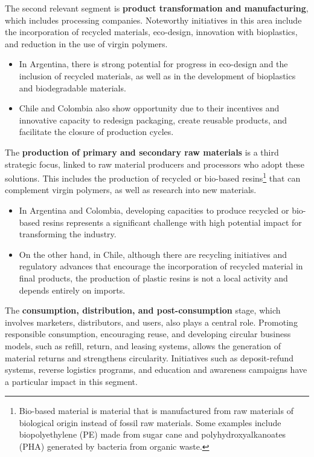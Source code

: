 \documentclass[
  12pt,
  oneside]{book}
\providecommand{\tightlist}{%
  \setlength{\itemsep}{0pt}\setlength{\parskip}{0pt}}
\begin{document}
The second relevant segment is \textbf{product transformation and
manufacturing}, which includes processing companies. Noteworthy
initiatives in this area include the incorporation of recycled
materials, eco-design, innovation with bioplastics, and reduction in the
use of virgin polymers.

\begin{itemize}
\tightlist
\item
  In Argentina, there is strong potential for progress in eco-design and
  the inclusion of recycled materials, as well as in the development of
  bioplastics and biodegradable materials.
\item
  Chile and Colombia also show opportunity due to their incentives and
  innovative capacity to redesign packaging, create reusable products,
  and facilitate the closure of production cycles.
\end{itemize}

The \textbf{production of primary and secondary raw materials} is a
third strategic focus, linked to raw material producers and processors
who adopt these solutions. This includes the production of recycled or
bio-based resins\footnote{Bio-based material is material that is
  manufactured from raw materials of biological origin instead of fossil
  raw materials. Some examples include biopolyethylene (PE) made from
  sugar cane and polyhydroxyalkanoates (PHA) generated by bacteria from
  organic waste.} that can complement virgin polymers, as well as
research into new materials.

\begin{itemize}
\tightlist
\item
  In Argentina and Colombia, developing capacities to produce recycled
  or bio-based resins represents a significant challenge with high
  potential impact for transforming the industry.
\item
  On the other hand, in Chile, although there are recycling initiatives
  and regulatory advances that encourage the incorporation of recycled
  material in final products, the production of plastic resins is not a
  local activity and depends entirely on imports.
\end{itemize}

The \textbf{consumption, distribution, and post-consumption} stage,
which involves marketers, distributors, and users, also plays a central
role. Promoting responsible consumption, encouraging reuse, and
developing circular business models, such as refill, return, and leasing
systems, allows the generation of material returns and strengthens
circularity. Initiatives such as deposit-refund systems, reverse
logistics programs, and education and awareness campaigns have a
particular impact in this segment.
\end{document}
